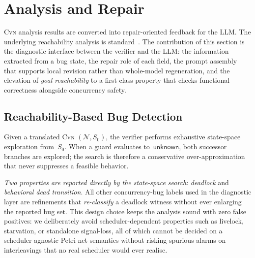 \section{Analysis and Repair}
\label{sec:analysis-repair}

\textsc{Cvn} analysis results are converted into repair-oriented feedback for the LLM\@. The underlying reachability analysis is
standard~\cite{Godefroid1997VeriSoft,Flanagan2005DPOR,
Musuvathi2008FairStateless,Esparza2008Unfoldings}. The contribution of this section is the diagnostic interface between the verifier and the LLM: the information extracted from a bug state, the repair role of each field, the prompt assembly that supports local revision rather than whole-model regeneration, and the elevation of
\emph{goal reachability} to a first-class property that checks functional correctness alongside concurrency safety.


\subsection{Reachability-Based Bug Detection}
\label{subsec:bug-patterns}

Given a translated \textsc{Cvn} $(\mathcal{N},S_0)$, the verifier
performs exhaustive state-space exploration from~$S_0$. When a guard
evaluates to~$\mathsf{unknown}$, both successor branches are explored;
the search is therefore a conservative over-approximation that never
suppresses a feasible behavior.

\emph{Two properties are reported directly by the state-space
search}: \emph{deadlock} and \emph{behavioral dead transition}.
All other concurrency-bug labels used in the diagnostic layer are
refinements that \emph{re-classify} a deadlock witness without ever
enlarging the reported bug set. This design choice keeps the analysis
sound with zero false positives: we deliberately avoid
scheduler-dependent properties such as livelock, starvation, or
standalone signal-loss, all of which cannot be decided on a
scheduler-agnostic Petri-net semantics without risking spurious alarms
on interleavings that no real scheduler would ever realise.

